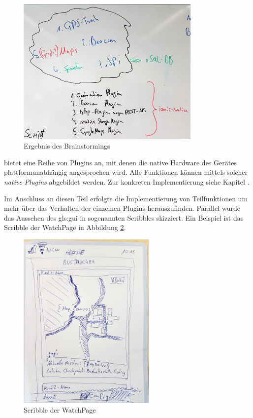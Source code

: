 \begin{figure}[htbp] 
  \centering
     \includegraphics[width=0.8\textwidth]{images/brainstorming.png} 
  \caption{Ergebnis des Brainstormings}
  \label{fig:Brainstorming}
\end{figure}

 bietet eine Reihe von Plugins an, mit denen die native Hardware des Gerätes plattformunabhängig angesprochen wird. Alle Funktionen können mittels solcher \emph{native Plugins} abgebildet werden. Zur konkreten Implementierung siehe Kapitel .

Im Anschluss an diesen Teil erfolgte die Implementierung von Teilfunktionen um mehr über das Verhalten der einzelnen Plugins herauszufinden. Parallel wurde das Aussehen des \gls{gls:gui} in sogenannten Scribbles skizziert. Ein Beispiel ist das Scribble der WatchPage in Abbildung \ref{fig:scribble}. 

\begin{figure}[htbp] 
  \centering
     \includegraphics[width=0.6\textwidth]{images/scribble.png} 
  \caption{Scribble der WatchPage}
  \label{fig:scribble}
\end{figure}

